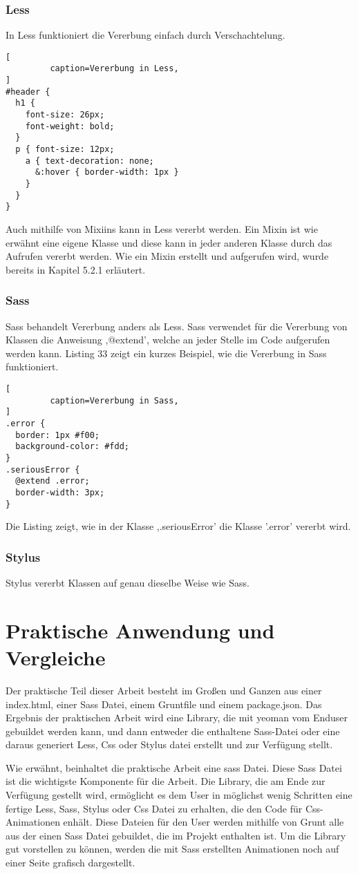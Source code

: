 \subsubsection{Less}
In Less funktioniert die Vererbung einfach durch Verschachtelung.
\begin{lstlisting}[
         caption=Vererbung in Less,
]
#header {
  h1 {
    font-size: 26px;
    font-weight: bold;
  }
  p { font-size: 12px;
    a { text-decoration: none;
      &:hover { border-width: 1px }
    }
  }
}
\end{lstlisting}
Auch mithilfe von Mixiins kann in Less vererbt werden. Ein Mixin ist wie erwähnt eine eigene Klasse und diese kann in jeder anderen Klasse durch das Aufrufen vererbt werden. Wie ein Mixin erstellt und aufgerufen wird, wurde bereits in Kapitel 5.2.1 erläutert.
\subsubsection{Sass}
Sass behandelt Vererbung anders als Less. Sass verwendet für die Vererbung von Klassen die Anweisung ,@extend', welche an jeder Stelle im Code aufgerufen werden kann. Listing 33 zeigt ein kurzes Beispiel, wie die Vererbung in Sass funktioniert.
\begin{lstlisting}[
         caption=Vererbung in Sass,
]
.error {
  border: 1px #f00;
  background-color: #fdd;
}
.seriousError {
  @extend .error;
  border-width: 3px;
}
\end{lstlisting}
Die Listing zeigt, wie in der Klasse ,.seriousError' die Klasse '.error' vererbt wird.
\subsubsection{Stylus}
Stylus vererbt Klassen auf genau dieselbe Weise wie Sass. 
\newpage
\section{Praktische Anwendung und Vergleiche}
Der praktische Teil dieser Arbeit besteht im Großen und Ganzen aus einer index.html, einer Sass Datei, einem Gruntfile und einem package.json.  Das Ergebnis der praktischen Arbeit wird eine Library, die mit yeoman vom Enduser gebuildet werden kann, und dann entweder die enthaltene Sass-Datei oder eine daraus generiert Less, Css oder Stylus datei erstellt und zur Verfügung stellt.

Wie erwähnt, beinhaltet die praktische Arbeit eine sass Datei. Diese Sass Datei ist die wichtigste Komponente für die Arbeit. Die Library, die am  Ende zur Verfügung gestellt wird, ermöglicht es dem User in möglichst wenig Schritten eine fertige Less, Sass, Stylus oder Css Datei zu erhalten, die den Code für Css-Animationen enhält. Diese Dateien für den User werden mithilfe von Grunt alle aus der einen Sass Datei gebuildet, die im Projekt enthalten ist.\newline
Um die Library gut vorstellen zu können, werden die mit Sass erstellten Animationen noch auf einer Seite grafisch dargestellt.\newline

